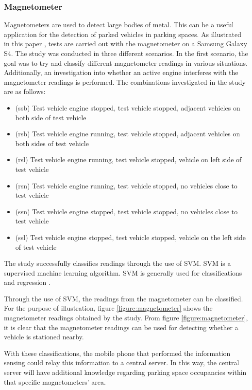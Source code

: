 \subsubsection*{Magnetometer}
Magnetometers are used to detect large bodies of metal. This can be a useful application for the detection of parked vehicles in parking spaces. As illustrated in this paper \citep{Villanueva2016CrowdsensingMonitoring}, tests are carried out with the magnetometer on a Samsung Galaxy S4. The study was conducted in three different scenarios. In the first scenario, the goal was to try and classify different magnetometer readings in various situations. Additionally, an investigation into whether an active engine interferes with the magnetometer readings is performed. The combinations investigated in the study are as follows:

\begin{itemize}
    \item (ssb) Test vehicle engine stopped, test vehicle stopped, adjacent vehicles on both side of test vehicle
    \item (rsb) Test vehicle engine running, test vehicle stopped, adjacent vehicles on both sides of test vehicle
    \item (rsl) Test vehicle engine running, test vehicle stopped, vehicle on left side of test vehicle
    \item (rsn) Test vehicle engine running, test vehicle stopped, no vehicles close to test vehicle
    \item (ssn) Test vehicle engine stopped, test vehicle stopped, no vehicles close to test vehicle
    \item (ssl) Test vehicle engine stopped, test vehicle stopped, vehicle on the left side of test vehicle
\end{itemize}

The study successfully classifies readings through the use of \ac{SVM}. \ac{SVM} is a supervised machine learning algorithm. \ac{SVM} is generally used for classifications and regression \citep{Suykens1999LeastClassifiers}. 

Through the use of \ac{SVM}, the readings from the magnetometer can be classified. For the purpose of illustration, figure \ref{figure:magnetometer} shows the magnetometer readings obtained by the study. From figure \ref{figure:magnetometer}, it is clear that the magnetometer readings can be used for detecting whether a vehicle is stationed nearby.

With these classifications, the mobile phone that performed the information sensing could relay this information to a central server. In this way, the central server will have additional knowledge regarding parking space occupancies within that specific magnetometers' area.

